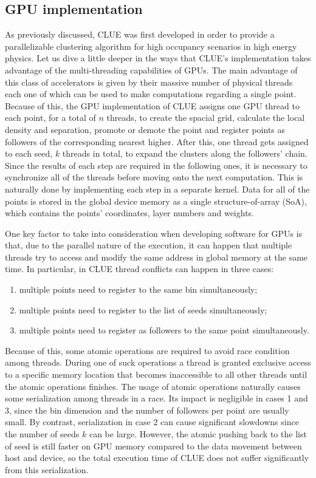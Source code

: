 \subsection{GPU implementation}
\label{ch:gpu_impl}
As previously discussed, CLUE was first developed in order to provide a parallelizable clustering algorithm for high occupancy scenarios in high energy physics. Let us dive a little deeper in the ways that CLUE's implementation takes advantage of the multi-threading capabilities of GPUs. The main advantage of this class of accelerators is given by their massive number of physical threads each one of which can be used to make computations regarding a single point. Because of this, the GPU implementation of CLUE assigns one GPU thread to each point, for a total of $n$ threads, to create the spacial grid, calculate the local density and separation, promote or demote the point and register points as followers of the corresponding nearest higher. After this, one thread gets assigned to each seed, $k$ threads in total, to expand the clusters along the followers' chain. Since the results of each step are required in the following ones, it is necessary to synchronize all of the threads before moving onto the next computation. This is naturally done by implementing each step in a separate kernel. Data for all of the points is stored in the global device memory as a single structure-of-array (SoA), which contains the points' coordinates, layer numbers and weights. 

One key factor to take into consideration when developing software for GPUs is that, due to the parallel nature of the execution, it can happen that multiple threads try to access and modify the same address in global memory at the same time. In particular, in CLUE thread conflicts can happen in three cases:
\begin{enumerate}
    \item multiple points need to register to the same bin simultaneously;
    \item multiple points need to register to the list of seeds simultaneously;
    \item multiple points need to register as followers to the same point simultaneously.
\end{enumerate}
Because of this, some atomic operations are required to avoid race condition among threads. During one of suck operations a thread is granted exclusive access to a specific memory location that becomes inaccessible to all other threads until the atomic operations finishes. The usage of atomic operations naturally causes some serialization among threads in a race. Its impact is negligible in cases 1 and 3, since the bin dimension and the number of followers per point are usually small. By contrast, serialization in case 2 can cause significant slowdowns since the number of seeds $k$ can be large. However, the atomic pushing back to the list of seed is still faster on GPU memory compared to the data movement between host and device, so the total execution time of CLUE does not suffer significantly from this serialization.

